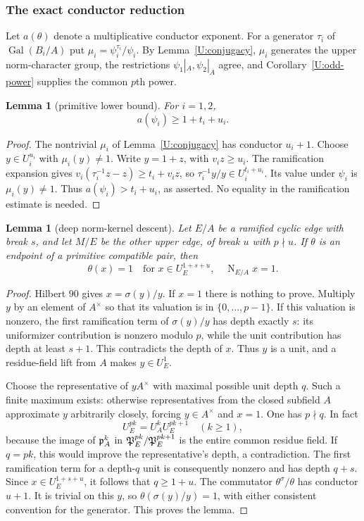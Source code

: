 \documentclass[11pt]{amsart}
\newtheorem{lemma}[theorem]{Lemma}
\theoremstyle{definition}
\theoremstyle{remark}
\newcommand{\Nm}{\operatorname{N}}
\newcommand{\Gal}{\operatorname{Gal}}
\begin{document}
\subsubsection*{The exact conductor reduction}
Let $a(\theta)$ denote a multiplicative conductor exponent. For a generator
$\tau_i$ of $\Gal(B_i/A)$ put $\mu_i=\psi_i^{\tau_i}/\psi_i$.
By Lemma~\ref{U:conjugacy}, $\mu_i$ generates the upper norm-character
group, the restrictions $\psi_1|_A,\psi_2|_A$ agree, and
Corollary~\ref{U:odd-power} supplies the common $p$th power.
\begin{lemma}[primitive lower bound]\label{O:G:lower}
For $i=1,2$,
\[
 a(\psi_i)\ge1+t_i+u_i.
\]
\end{lemma}
\begin{proof}
The nontrivial $\mu_i$ of Lemma~\ref{U:conjugacy} has conductor $u_i+1$.
Choose $y\in U_i^{u_i}$ with $\mu_i(y)\ne1$.
Write $y=1+z$, with $v_i z\ge u_i$. The ramification expansion gives
$v_i(\tau_i^{-1}z-z)\ge t_i+v_i z$, so
$\tau_i^{-1}y/y\in U_i^{t_i+u_i}$. Its value under $\psi_i$ is
$\mu_i(y)\ne1$. Thus $a(\psi_i)>t_i+u_i$, as asserted.
No equality in the ramification estimate is needed.
\end{proof}

\begin{lemma}[deep norm-kernel descent]\label{O:G:deep}
Let $E/A$ be a ramified cyclic edge with break $s$, and let $M/E$ be
the other upper edge, of break $u$ with $p\nmid u$. If $\theta$ is
an endpoint of a primitive compatible pair, then
\[
 \theta(x)=1\quad\text{for }x\in U_E^{1+s+u},\quad\Nm_{E/A}x=1.
\]
\end{lemma}
\begin{proof}
Hilbert 90 gives $x=\sigma(y)/y$. If $x=1$ there is nothing to prove.
Multiply $y$ by an element of $A^\times$ so that its valuation is
in $\{0,\ldots,p-1\}$. If this valuation is nonzero, the first
ramification term of $\sigma(y)/y$ has depth exactly $s$:
its uniformizer contribution is nonzero modulo $p$, while the unit
contribution has depth at least $s+1$. This contradicts the depth of
$x$. Thus $y$ is a unit, and a residue-field lift from $A$ makes
$y\in U_E^1$.

Choose the representative of $yA^\times$ with maximal possible unit
depth $q$. Such a finite maximum exists: otherwise representatives
from the closed subfield $A$ approximate $y$ arbitrarily closely,
forcing $y\in A^\times$ and $x=1$.
One has $p\nmid q$. In fact
\[
 U_E^{pk}=U_A^k U_E^{pk+1}\quad(k\ge1),
\]
because the image of $\mathfrak p_A^k$ in
$\mathfrak P_E^{pk}/\mathfrak P_E^{pk+1}$ is the entire common residue field.
If $q=pk$, this would improve the representative's depth, a contradiction.
The first ramification term for a depth-$q$ unit is consequently
nonzero and has depth $q+s$. Since $x\in U_E^{1+s+u}$, it follows
that $q\ge1+u$.
The commutator $\theta^{\sigma}/\theta$ has conductor $u+1$.
It is trivial on this $y$, so $\theta(\sigma(y)/y)=1$, with either
consistent convention for the generator. This proves the lemma.
\end{proof}
\end{document}
